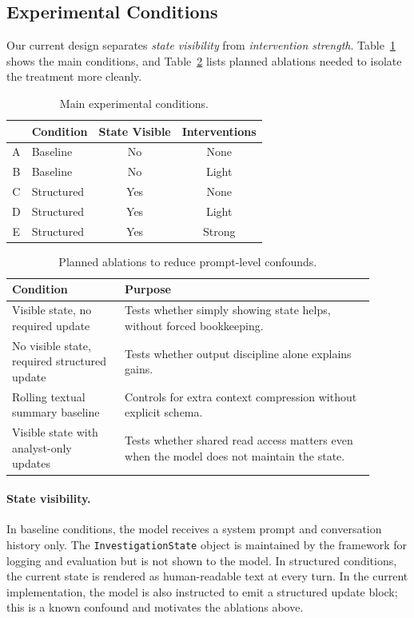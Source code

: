 \documentclass[letterpaper]{article}
\begin{document}
\subsection{Experimental Conditions}

Our current design separates \emph{state visibility} from \emph{intervention strength}.
Table~\ref{tab:conditions} shows the main conditions, and Table~\ref{tab:ablations} lists planned ablations needed to isolate the treatment more cleanly.

\begin{table}[t]
\centering
\caption{Main experimental conditions.}
\label{tab:conditions}
\begin{tabular}{clcc}
\toprule
 & Condition & State Visible & Interventions \\
\midrule
A & Baseline & No & None \\
B & Baseline & No & Light \\
C & Structured & Yes & None \\
D & Structured & Yes & Light \\
E & Structured & Yes & Strong \\
\bottomrule
\end{tabular}
\end{table}

\begin{table}[t]
\centering
\caption{Planned ablations to reduce prompt-level confounds.}
\label{tab:ablations}
\begin{tabular}{p{0.28\linewidth}p{0.62\linewidth}}
\toprule
Condition & Purpose \\
\midrule
Visible state, no required update & Tests whether simply showing state helps, without forced bookkeeping. \\
No visible state, required structured update & Tests whether output discipline alone explains gains. \\
Rolling textual summary baseline & Controls for extra context compression without explicit schema. \\
Visible state with analyst-only updates & Tests whether shared read access matters even when the model does not maintain the state. \\
\bottomrule
\end{tabular}
\end{table}

\paragraph{State visibility.}
In baseline conditions, the model receives a system prompt and conversation history only.
The \texttt{InvestigationState} object is maintained by the framework for logging and evaluation but is not shown to the model.
In structured conditions, the current state is rendered as human-readable text at every turn.
In the current implementation, the model is also instructed to emit a structured update block; this is a known confound and motivates the ablations above.
\end{document}
